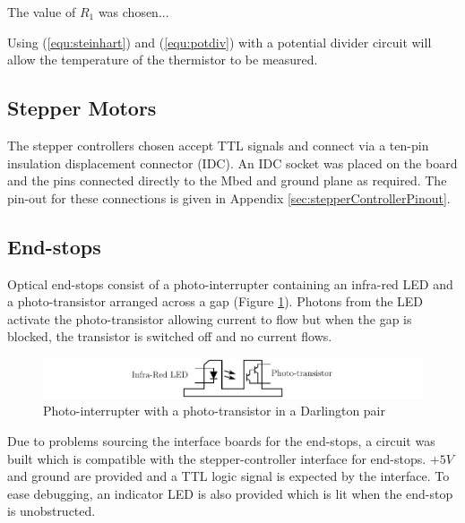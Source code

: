 			
			The value of $R_1$ was chosen...
			
			Using (\ref{equ:steinhart}) and (\ref{equ:potdiv}) with a potential
			divider circuit will allow the temperature of the thermistor to be
			measured.
			
		
		\subsection{Stepper Motors}
			
			The stepper controllers chosen accept TTL signals and connect via a
			ten-pin insulation displacement connector (IDC). An IDC socket was
			placed on the board and the pins connected directly to the Mbed and
			ground plane as required. The pin-out for these connections is given in
			Appendix \ref{sec:stepperControllerPinout}.
			
		
		\subsection{End-stops}
			
			Optical end-stops consist of a photo-interrupter containing an infra-red
			LED and a photo-transistor arranged across a gap (Figure
			\ref{fig:endstop}). Photons from the LED activate the photo-transistor
			allowing current to flow but when the gap is blocked, the transistor is
			switched off and no current flows.
			
			\begin{figure}
				\includegraphics[width=1\textwidth]{diagrams/endstop.pdf}
				\caption{Photo-interrupter with a photo-transistor in a Darlington pair}
				\label{fig:endstop}
			\end{figure}
			
			Due to problems sourcing the interface boards for the end-stops, a
			circuit was built which is compatible with the stepper-controller
			interface for end-stops. $+5V$ and ground are provided and a TTL logic
			signal is expected by the interface. To ease debugging, an indicator LED
			is also provided which is lit when the end-stop is unobstructed.
			
			
